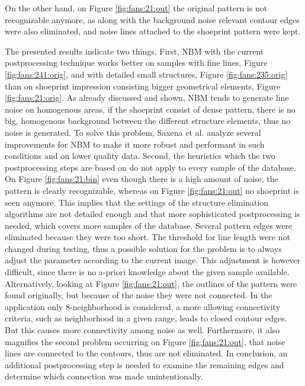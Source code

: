 \documentclass[draft,final]{vutinfth} %
\begin{document}
On the other hand, on Figure \ref{fig:fans:21:out} the original pattern is not recognizable anymore, as along with the background noise relevant contour edges were also eliminated, and noise lines attached to the shoeprint pattern were kept.
\par
The presented results indicate two things.
First, NBM with the current postprocessing technique works better on samples with fine lines, Figure \ref{fig:fans:241:orig}, and with detailed small structures, Figure \ref{fig:fans:235:orig} than on shoeprint impression consisting bigger geometrical elements, Figure \ref{fig:fans:21:orig}.
As already discussed and shown, NBM tends to generate line noise on homogenous areas, if the shoeprint consist of dense pattern, there is no big, homogenous background between the different structure elements, thus no noise is generated.
To solve this problem, Saxena et al. \cite{saxena2019niblack} analyze several improvements for NBM to make it more robust and performant in such conditions and on lower quality data.
Second, the heuristics which the two postprocessing steps are based on do not apply to every sample of the database.
On Figure  \ref{fig:fans:21:bin} even though there is a high amount of noise, the pattern is clearly recognizable, whereas on Figure \ref{fig:fans:21:out} no shoeprint is seen anymore.
This implies that the settings of the structure elimination algorithms are not detailed enough and that more sophisticated postprocessing is needed, which covers more samples of the database.
Several pattern edges were eliminated because they were too short.
The threshold for line length were not changed during testing, thus a possible solution for the problem is to always adjust the parameter according to the current image.
This adjustment is however difficult, since there is no a-priori knowledge about the given sample available.
Alternatively, looking at Figure  \ref{fig:fans:21:out}, the outlines of the pattern were found originally, but because of the noise they were not connected.
In the application only 8-neighborhood is considered, a more allowing connectivity criteria, such as neighborhood in a given range, leads to closed contour edges.
But this causes more connectivity among noise as well.
Furthermore, it also magnifies the second problem occurring on Figure \ref{fig:fans:21:out}, that noise lines are connected to the contours, thus are not eliminated.
In conclusion, an additional postprocessing step is needed to examine the remaining edges and determine which connection was made unintentionally.
\par
\end{document}
